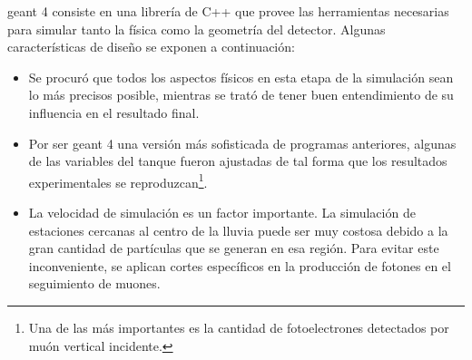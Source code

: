 		{\sc geant 4} consiste en una librer\'ia de C++ que provee las herramientas necesarias para simular tanto la f\'isica como la geometr\'ia del detector.
		Algunas caracter\'isticas de dise\~no se exponen a continuaci\'on:
		\begin{itemize}
		\item Se procur\'o que todos los aspectos f\'isicos en esta etapa de la simulaci\'on sean lo m\'as precisos posible, mientras se trat\'o de tener buen entendimiento de su influencia en el resultado final.
		\item Por ser {\sc geant 4} una versi\'on m\'as sofisticada de programas anteriores, algunas de las variables del tanque fueron ajustadas de tal forma que los resultados experimentales se reproduzcan\footnote{Una de las m\'as importantes es la cantidad de fotoelectrones detectados por mu\'on vertical incidente.}.
		\item La velocidad de simulaci\'on es un factor importante.
		La simulaci\'on de estaciones cercanas al centro de la lluvia puede ser muy costosa debido a la gran cantidad de part\'iculas que se generan en esa regi\'on. Para evitar este inconveniente, se aplican cortes espec\'ificos en la producci\'on de fotones en el seguimiento de muones.
		\end{itemize}
		
